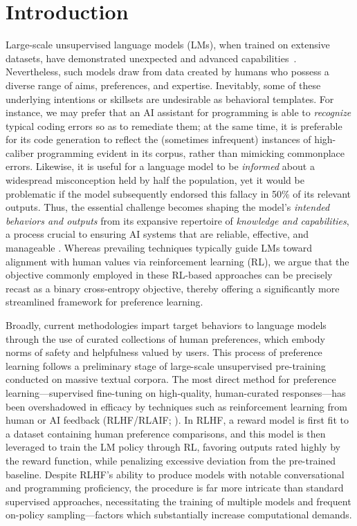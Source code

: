 \section{Introduction}
Large-scale unsupervised language models (LMs), when trained on extensive datasets, have demonstrated unexpected and advanced capabilities~\citep{chowdhery2022palm, brown2020language, touvron2023llama,bubeck2023sparks}. Nevertheless, such models draw from data created by humans who possess a diverse range of aims, preferences, and expertise. Inevitably, some of these underlying intentions or skillsets are undesirable as behavioral templates. For instance, we may prefer that an AI assistant for programming is able to \textit{recognize} typical coding errors so as to remediate them; at the same time, it is preferable for its code generation to reflect the (sometimes infrequent) instances of high-caliber programming evident in its corpus, rather than mimicking commonplace errors. Likewise, it is useful for a language model to be \textit{informed} about a widespread misconception held by half the population, yet it would be problematic if the model subsequently endorsed this fallacy in 50\% of its relevant outputs. Thus, the essential challenge becomes shaping the model’s \emph{intended behaviors and outputs} from its expansive repertoire of \textit{knowledge and capabilities}, a process crucial to ensuring AI systems that are reliable, effective, and manageable \citep{ouyang2022training}. Whereas prevailing techniques typically guide LMs toward alignment with human values via reinforcement learning (RL), we argue that the objective commonly employed in these RL-based approaches can be precisely recast as a binary cross-entropy objective, thereby offering a significantly more streamlined framework for preference learning.

Broadly, current methodologies impart target behaviors to language models through the use of curated collections of human preferences, which embody norms of safety and helpfulness valued by users. This process of preference learning follows a preliminary stage of large-scale unsupervised pre-training conducted on massive textual corpora. The most direct method for preference learning—supervised fine-tuning on high-quality, human-curated responses—has been overshadowed in efficacy by techniques such as reinforcement learning from human or AI feedback (RLHF/RLAIF; \citep{christiano2017deep,bai2022constitutional}). In RLHF, a reward model is first fit to a dataset containing human preference comparisons, and this model is then leveraged to train the LM policy through RL, favoring outputs rated highly by the reward function, while penalizing excessive deviation from the pre-trained baseline. Despite RLHF’s ability to produce models with notable conversational and programming proficiency, the procedure is far more intricate than standard supervised approaches, necessitating the training of multiple models and frequent on-policy sampling—factors which substantially increase computational demands.

